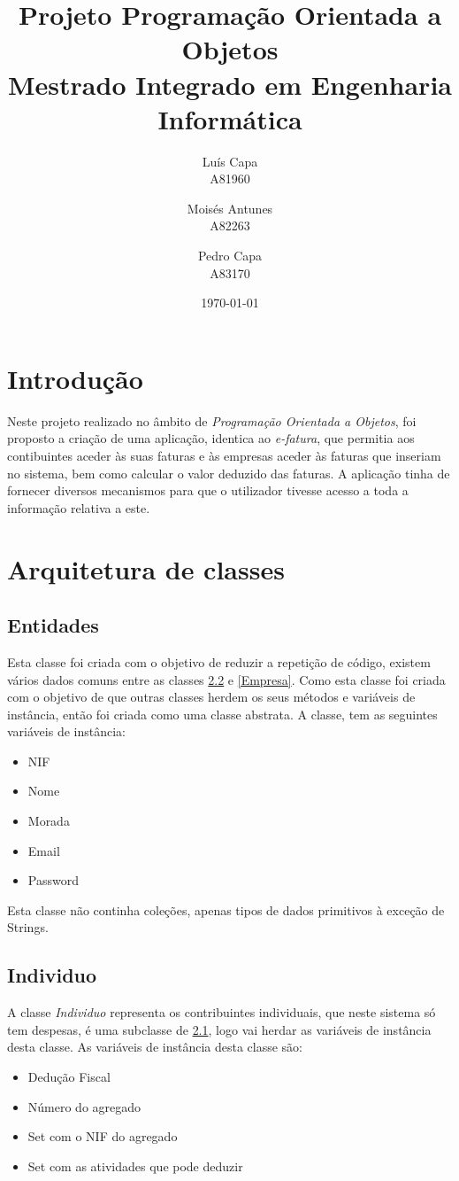 \documentclass[10pt, a4paper]{report}
\title{Projeto Programação Orientada a Objetos \\ Mestrado Integrado em Engenharia Informática}
\author{Luís Capa \\ A81960 
	\and 
	Moisés Antunes \\ A82263
	\and
	Pedro Capa \\ A83170
}
\date{\today}
\begin{document}
\maketitle
\tableofcontents

\chapter{Introdução}\label{introducao}

Neste projeto realizado no âmbito de \emph{Programação Orientada a Objetos}, foi proposto a criação de uma aplicação, identica ao \emph{e-fatura}, que permitia aos contibuintes aceder às suas faturas e às empresas aceder às faturas que inseriam no sistema, bem como calcular o valor deduzido das faturas. A aplicação tinha de fornecer diversos mecanismos para que o utilizador tivesse acesso a toda a informação relativa a este.

\chapter{Arquitetura de classes}\label{Arquitetura}

\section{Entidades}\label{entidades}

Esta classe foi criada com o objetivo de reduzir a repetição de código, existem vários dados comuns entre as classes \ref{Individuo} e \ref{Empresa}. Como esta classe foi criada com o objetivo de que outras classes herdem os seus métodos e variáveis de instância, então foi criada como uma classe abstrata.
A classe, tem as seguintes variáveis de instância:
\begin{itemize}
	\item NIF
	\item Nome
	\item Morada
	\item Email
	\item Password
\end{itemize}
Esta classe não continha coleções, apenas tipos de dados primitivos à exceção de Strings.

\section{Individuo}\label{Individuo}

A classe \emph{Individuo} representa os contribuintes individuais, que neste sistema só tem despesas, é uma subclasse de \ref{entidades}, logo vai herdar as variáveis de instância desta classe. As variáveis de instância desta classe são:
\begin{itemize}
	\item Dedução Fiscal
	\item Número do agregado
	\item Set com o NIF do agregado
	\item Set com as atividades que pode deduzir
\end{itemize}
\end{document}
